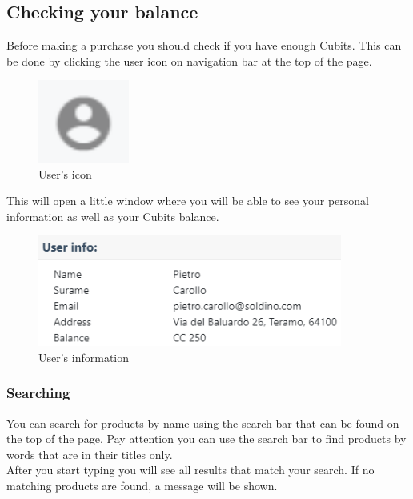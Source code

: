 		\subsection{Checking your balance}
		Before making a purchase you should check if you have enough Cubits\glo.
		This can be done by clicking the user icon on navigation bar at the top 
		of the page.
		\begin{figure}[H]
			\includegraphics[width=3cm]{res/images/user_icon.png}
			\centering
			\caption{User's icon}
		\end{figure}
		\noindent This will open a little window where you will be able to see 
		your personal information as well as your Cubits balance.
		\begin{figure}[H]
			\includegraphics[width=10cm]{res/images/user_info.png}
			\centering
			\caption{User's information}
		\end{figure}
		\subsubsection{Searching}
		You can search for products by name using the search bar that can be 
		found on the top of the page. Pay attention you can use the search bar 
		to find products by words that are in their titles only. \\
		After you start typing you will see 
		all results that match your search. If no matching products are 
		found, a message will be shown.
%		
